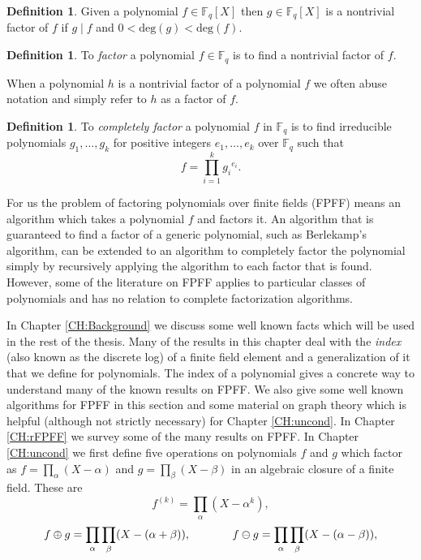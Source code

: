 \documentclass{article}
\newcounter{dummy} \numberwithin{dummy}{section}
\theoremstyle{plain}
\theoremstyle{definition}
\newtheorem{mydef}[dummy]{Definition}
\def\Fq {{ \mathbb{F} _ {q} }}
\def\deg {{ \mathrm{deg}}}
\begin{document}
		\begin{mydef}
		\label{DEF:NONTRIVFACTOR}
		    Given a polynomial $f \in \Fq[X]$ then $g \in \Fq[X]$ is a nontrivial factor of $f$ if $g \mid f$ and $0<\deg(g)<\deg(f)$.  
		\end{mydef}

		\begin{mydef}
		\label{DEF:FACTOR}
		    To \emph{factor} a polynomial $f \in \Fq$ is to find a nontrivial factor of $f$.  
		\end{mydef}
		
		When a polynomial $h$ is a nontrivial factor of a polynomial $f$ we often abuse notation and simply refer to $h$ as a factor of $f$.   

		\begin{mydef}
		\label{DEF:COMPFACTORIZATION}
		To \emph{completely factor} a polynomial $f$ in $\Fq$ is to find irreducible polynomials $g_1,\ldots, g_k$ for positive integers $e_1,\ldots, e_k$ over $\Fq$ such that
		\[ f=\prod_{i=1}^k{{g_i}^{e_i}}. \] 
		\end{mydef}

		For us the problem of factoring polynomials over finite fields (FPFF) means an algorithm which takes a polynomial $f$ and factors it. An algorithm that is guaranteed to find a factor of a generic polynomial, such as Berlekamp's algorithm, can be extended to an algorithm to completely factor the polynomial simply by recursively applying the algorithm to each factor that is found. However, some of the literature on FPFF applies to particular classes of polynomials and has no relation to complete factorization algorithms. 
		
		In Chapter \ref{CH:Background} we discuss some well known facts which will be used in the rest of the thesis. Many of the results in this chapter deal with the \emph{index} (also known as the discrete log) of a finite field element and a generalization of it that we define for polynomials. The index of a polynomial gives a concrete way to understand many of the known results on FPFF. We also give some well known algorithms for FPFF in this section and some material on graph theory which is helpful (although not strictly necessary) for Chapter \ref{CH:uncond}.
		In Chapter \ref{CH:rFPFF} we survey some of the many results on FPFF. In Chapter \ref{CH:uncond} we first define five operations on polynomials $f$ and $g$ which factor as $f=\prod_{\alpha}{(X-\alpha)}$ and $g=\prod_{\beta}{(X-\beta)}$ in an algebraic closure of a finite field. These are
		\[ f^{(k)} = \prod_{\alpha}({X-\alpha^k}), \]	
		\[ f \oplus g = \prod_{\alpha}{\prod_{\beta}({X-(\alpha+\beta)})}, 
	      \hspace{13 mm} 
		    f \ominus g = \prod_{\alpha}{\prod_{\beta}({X-(\alpha-\beta}))}, \]
	
\end{document}
